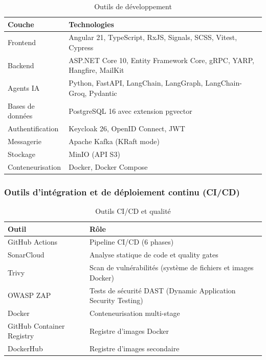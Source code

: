 \begin{table}[H]
\centering
\caption{Outils de développement}
\label{tab:outils-dev}
\begin{tabularx}{\textwidth}{lX}
\toprule
\textbf{Couche} & \textbf{Technologies} \\
\midrule
Frontend & Angular 21, TypeScript, RxJS, Signals, SCSS, Vitest, Cypress \\
Backend & ASP.NET Core 10, Entity Framework Core, gRPC, YARP, Hangfire, MailKit \\
Agents IA & Python, FastAPI, LangChain, LangGraph, LangChain-Groq, Pydantic \\
Bases de données & PostgreSQL 16 avec extension pgvector \\
Authentification & Keycloak 26, OpenID Connect, JWT \\
Messagerie & Apache Kafka (KRaft mode) \\
Stockage & MinIO (API S3) \\
Conteneurisation & Docker, Docker Compose \\
\bottomrule
\end{tabularx}
\end{table}

\subsubsection{Outils d'intégration et de déploiement continu (CI/CD)}
\label{subsubsec:realisation:outils-cicd}

\begin{table}[H]
\centering
\caption{Outils CI/CD et qualité}
\label{tab:outils-cicd}
\begin{tabularx}{\textwidth}{lX}
\toprule
\textbf{Outil} & \textbf{Rôle} \\
\midrule
GitHub Actions & Pipeline CI/CD (6 phases) \\
SonarCloud & Analyse statique de code et quality gates \\
Trivy & Scan de vulnérabilités (système de fichiers et images Docker) \\
OWASP ZAP & Tests de sécurité DAST (Dynamic Application Security Testing) \\
Docker & Conteneurisation multi-stage \\
GitHub Container Registry & Registre d'images Docker \\
DockerHub & Registre d'images secondaire \\
\bottomrule
\end{tabularx}
\end{table}

